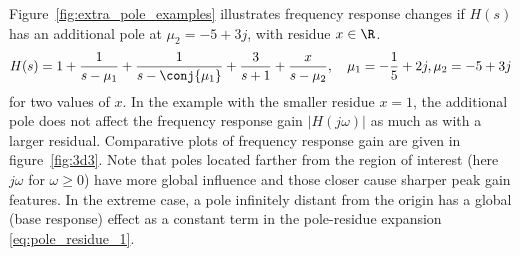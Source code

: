  Figure~\ref{fig:extra_pole_examples} illustrates frequency response changes if $H(s)$ has an additional pole at $\mu_2=-5+3j$, with residue $x\in\R$. 
\begin{equation}
H(s)=1 + \frac{1}{s-\mu_1}+\frac{1}{s-\conj{\mu_1}}+\frac{3}{s+1}+\frac{x}{s -\mu_2}, \quad \mu_1 = -\frac{1}{5}+2j, \mu_2 = -5+3j
\label{eq:example_tfunc2}
\end{equation}
for two values of $x$.   In the example with the smaller residue $x=1$, the additional pole does not affect the frequency response gain $|H(j\omega)|$ as much as with a larger residual.   Comparative plots of frequency response gain are given in figure~\ref{fig:3d3}.
Note that poles located farther from the region of interest  (here $j\omega$ for $\omega\geq 0$)  have more global influence and those closer cause sharper peak gain  features.  In the extreme case, a pole infinitely distant from the origin has a global (base response) effect as a constant term in the pole-residue expansion 	\eqref{eq:pole_residue_1}.  
\clearpage
